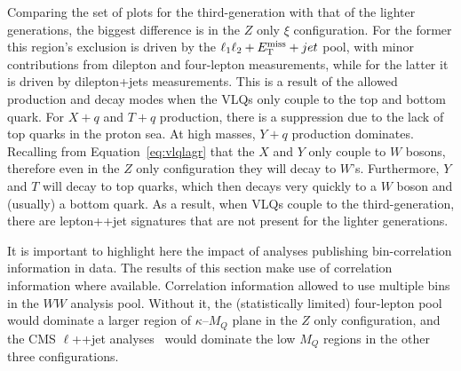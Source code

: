 Comparing the set of plots for the third-generation with that of the lighter generations, the biggest difference is in the $Z$ only $\xi$ configuration. For the former this region's exclusion is driven by the \ATLAS $\ell_1 \ell_2 + E_\mathrm{T}^\mathrm{miss}{} + jet$ pool, with minor contributions from dilepton and four-lepton measurements, while for the latter it is driven by dilepton+jets measurements. This is a result of the allowed production and decay modes when the VLQs only couple to the top and bottom quark. For $X+q$ and $T+q$ production, there is a suppression due to the lack of top quarks in the proton sea. At high masses, $Y+q$ production dominates. Recalling from Equation~\ref{eq:vlqlagr} that the $X$ and $Y$ only couple to $W$ bosons, therefore even in the $Z$ only configuration they will decay to $W$'s. Furthermore, $Y$ and $T$ will decay to top quarks, which then decays very quickly to a $W$ boson and (usually) a bottom quark. As a result, when VLQs couple to the third-generation, there are lepton+\MET+jet signatures that are not present for the lighter generations.

It is important to highlight here the impact of analyses publishing bin-correlation information in data. The results of this section make use of correlation information where available. Correlation information allowed \contur to use multiple bins in the $WW$ analysis pool. Without it, the (statistically limited) \ATLAS four-lepton pool would dominate a larger region of $\kappa$--$M_Q$ plane in the $Z$ only configuration, and the CMS $\ell$+\MET{}+jet analyses~\cite{Aaboud:2018uzf,Aaboud:2017fha,Aaboud:2018eki,Sirunyan:2018wem,Khachatryan:2016mnb,Sirunyan:2018ptc} would dominate the low $M_Q$ regions in the other three configurations.


